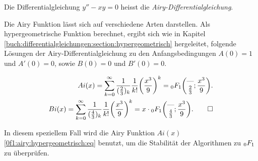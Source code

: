 \begin{definition}
    \label{0f1:airy:differentialgleichung:def}
    Die Differentialgleichung
    $y'' - xy = 0$
    heisst die {\em Airy-Differentialgleichung}. \cite{0f1:wiki-airyFunktion} 
\end{definition}

Die Airy Funktion lässt sich auf verschiedene Arten darstellen. \cite{0f1:wiki-airyFunktion} 
Als hypergeometrische Funktion berechnet, ergibt sich wie in Kapitel \ref{buch:differentialgleichungen:section:hypergeometrisch} hergeleitet, folgende Lösungen der Airy-Differentialgleichung zu den Anfangsbedingungen $A(0)=1$ und $A'(0)=0$, sowie $B(0)=0$ und $B'(0)=0$.

\begin{align}
\label{0f1:airy:hypergeometrisch:eq}
Ai(x)
=
\sum_{k=0}^\infty
\frac{1}{(\frac23)_k} \frac{1}{k!}\biggl(\frac{x^3}{9}\biggr)^k
=
\mathstrut_0F_1\biggl(
\begin{matrix}\text{---}\\\frac23\end{matrix};\frac{x^3}{9}
\biggr).
\\
Bi(x)
=
\sum_{k=0}^\infty
\frac{1}{(\frac43)_k} \frac{1}{k!}\biggl(\frac{x^3}{9}\biggr)^k
=
x\cdot\mathstrut_0F_1\biggl(
\begin{matrix}\text{---}\\\frac43\end{matrix};
\frac{x^3}{9}
\biggr).
\qedhere
\end{align}

In diesem speziellem Fall wird die Airy Funktion $Ai(x)$ \eqref{0f1:airy:hypergeometrisch:eq}
benutzt, um die Stabilität der Algorithmen zu $\mathstrut_0F_1$ zu überprüfen.


